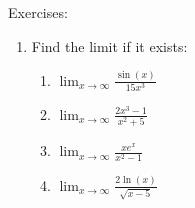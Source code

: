 \documentclass[../revisedmain.tex]{subfiles}
\begin{document}
	\begin{center}
		{\LARGE Exercises:}
	\end{center}
	\begin{enumerate}
		\item Find the limit if it exists:
		\begin{enumerate}
			\item $\lim_{x\to\infty}\frac{\sin(x)}{15x^3}$
			\item $\lim_{x\to\infty}\frac{2x^3-1}{x^2+5}$
			\item $\lim_{x\to\infty}\frac{xe^x}{x^2-1}$
			\item $\lim_{x\to\infty}\frac{2\ln(x)}{\sqrt{x-5}}$
		\end{enumerate}
	\end{enumerate}
\end{document}
